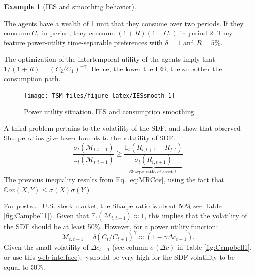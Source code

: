 \documentclass[
  12pt,
]{book}
\theoremstyle{definition}
\theoremstyle{definition}
\newtheorem{example}{Example}[chapter]
\theoremstyle{definition}
\theoremstyle{definition}
\theoremstyle{remark}
\begin{document}
\begin{example}[IES and smoothing behavior]
\protect\hypertarget{exm:IESsmoothing}{}\label{exm:IESsmoothing}

The agents have a wealth of 1 unit that they consume over two periods. If they consume \(C_1\) in period, they consume \((1+R)(1-C_1)\) in period 2. They feature power-utility time-separable preferences with \(\delta=1\) and \(R=5\%\).

The optimization of the intertemporal utility of the agents imply that \(1/(1+R)=(C_2/C_1)^{-\gamma}\). Hence, the lower the IES, the smoother the consumption path.

\begin{figure}
\texttt{[image: TSM\_files/figure-latex/IESsmooth-1]} \caption{Power utility situation. IES and consumption smoothing.}\label{fig:IESsmooth}
\end{figure}

\end{example}

A third problem pertains to the volatility of the SDF. \citet{Grossman_Shiller_1981} and \citet{Hansen_Jagannathan_1991} show that observed Sharpe ratios give lower bounds to the volatility of SDF:
\[
\frac{\sigma_t(\mathcal{M}_{t,t+1})}{\mathbb{E}_t(\mathcal{M}_{t,t+1})} \ge \underbrace{\frac{\mathbb{E}_t(R_{i,t+1}-R_{f,t})}{\sigma_t(R_{i,t+1})}}_{\mbox{Sharpe ratio of asset $i$.}}
\]
The previous inequality results from Eq. \eqref{eq:MRCov}, using the fact that \(\mathbb{C}ov(X,Y) \le \sigma(X)\sigma(Y)\).

For postwar U.S. stock market, the Sharpe ratio is about 50\% see Table \ref{fig:Campbell1}). Given that \(\mathbb{E}_t(\mathcal{M}_{t,t+1}) \approx 1\), this implies that the volatility of the SDF should be at least 50\%.
However, for a power utility function:
\[
\mathcal{M}_{t,t+1}=\delta (C_t/C_{t+1})^\gamma \approx (1 - \gamma \Delta c_{t+1}).
\]
Given the small volatility of \(\Delta c_{t+1}\) (see column \(\sigma(\Delta c)\) in Table \ref{fig:Campbell1}, or use this \href{https://jrenne.shinyapps.io/APModels}{web interface}), \(\gamma\) should be very high for the SDF volatility to be equal to 50\%.
\end{document}
